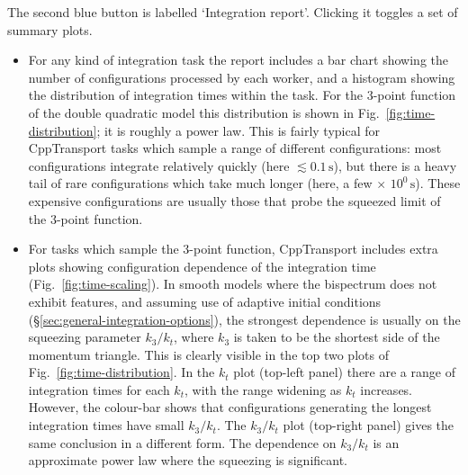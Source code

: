 \documentclass[11pt,a4paper]{article}
\newcommand{\packagefont}{\sffamily}
\newcommand{\CppTransport}{{\packagefont CppTransport}}
\newcommand{\second}{\,\mathrm{s}}
\newcommand{\semibold}[1]{{\fontseries{b}\selectfont{#1}}}
\newcommand{\para}[1]{\par\vspace{2mm}\noindent\semibold{{#1.}---}\ignorespaces}
\begin{document}
\para{Integration report}
The second blue button is labelled `Integration report'.
Clicking it toggles a set of summary plots.
\begin{itemize}
    \item For any kind of integration task the report includes a
    bar chart showing the number of configurations processed by each
    worker, and a histogram showing the distribution of integration times
    within the task.
    For the 3-point function of the double quadratic model
    this distribution is shown in Fig.~\ref{fig:time-distribution};
    it is roughly a power law.
    This is fairly typical for
    {\CppTransport} tasks which sample a range of different configurations:
    most configurations integrate relatively quickly
    (here $\lesssim 0.1 \second$),
    but there is a heavy tail of
    rare configurations
    which take much longer
    (here, a few $\times$ $10^0 \second$).
    These expensive configurations are usually those that probe the
    squeezed limit of the 3-point function.
    
    \item For tasks which sample the 3-point function, {\CppTransport}
    includes extra plots showing configuration dependence of the
    integration time
    (Fig.~\ref{fig:time-scaling}).
    In smooth models where the bispectrum does not exhibit features,
    and assuming use of adaptive initial conditions (\S\ref{sec:general-integration-options}),
    the strongest dependence is usually on the squeezing parameter
    $k_3 / k_t$, where $k_3$
    is taken to be the shortest side of the momentum triangle.
    This is clearly visible in the top two plots of Fig.~\ref{fig:time-distribution}.
    In the $k_t$ plot (top-left panel)
    there are a range of integration times for each $k_t$, with the range
    widening as $k_t$ increases.
    However, the colour-bar shows that configurations generating the longest
    integration times have small $k_3/k_t$.
    The $k_3/k_t$ plot (top-right panel)
    gives the same conclusion in a different form.
    The dependence on $k_3/k_t$ is an approximate power law where the
    squeezing is significant.
\end{itemize}
\end{document}
